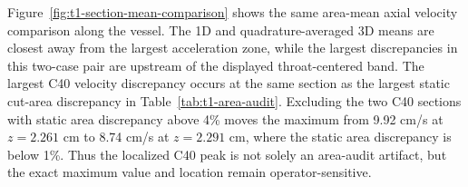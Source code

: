 \begin{table}[!htb]
    \centering
    \scriptsize
    \caption{Quadrature-backed section velocity and physical-flow discrepancy
    summary at nominally aligned final-time samples. These are
    single-realization descriptors. Mean velocities and velocity discrepancies
    are in cm/s; physical flows and flow discrepancies are in cm$^3$/s. Angle
    brackets denote axial sample means over the 200 retained comparison
    sections, not temporal averages or inner products. The 1D physical flow is
    $Q_{1D}=\pi q$.}
    \label{tab:t1-3d-comparison-summary}
    {\setlength{\tabcolsep}{1.8pt}
    }
\end{table}

Figure~\ref{fig:t1-section-mean-comparison} shows the same area-mean axial
velocity comparison along the vessel. The 1D and quadrature-averaged 3D means
are closest away from the largest acceleration zone, while the largest
discrepancies in this two-case pair are upstream of the displayed throat-centered
band. The largest C40 velocity discrepancy occurs at the same section as the
largest static cut-area discrepancy in Table~\ref{tab:t1-area-audit}. Excluding
the two C40 sections with static area discrepancy above 4\% moves the maximum
from 9.92 cm/s at $z=2.261$ cm to 8.74 cm/s at $z=2.291$ cm, where the static
area discrepancy is below 1\%. Thus the localized C40 peak is not solely an
area-audit artifact, but the exact maximum value and location remain
operator-sensitive.

